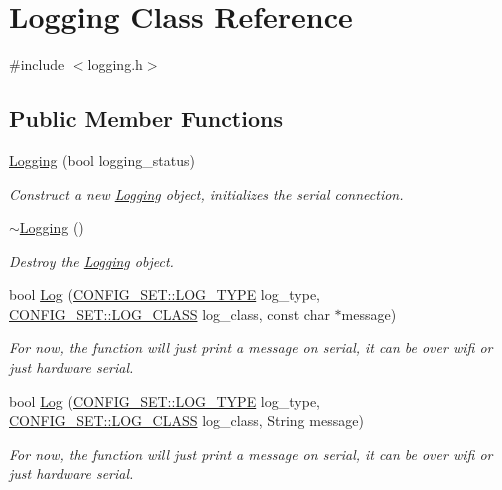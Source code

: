 \hypertarget{classLogging}{}\section{Logging Class Reference}
\label{classLogging}


{\ttfamily \#include $<$logging.\+h$>$}

\subsection*{Public Member Functions}
\begin{DoxyCompactItemize}
\item 
\hyperlink{classLogging_a3180cbe3cd3f25a926092066a157b884}{Logging} (bool logging\+\_\+status)
\begin{DoxyCompactList}\small\item\em Construct a new \hyperlink{classLogging}{Logging} object, initializes the serial connection. \end{DoxyCompactList}\item 
\hyperlink{classLogging_af6a0971121f5b0d9d6ebfb4e69b20a4d}{$\sim$\+Logging} ()
\begin{DoxyCompactList}\small\item\em Destroy the \hyperlink{classLogging}{Logging} object. \end{DoxyCompactList}\item 
bool \hyperlink{classLogging_abefeba86ea7c9ec93b7de22fc03a558e}{Log} (\hyperlink{namespaceCONFIG__SET_aaf9764960ee214f0eaabd2461e30e932}{C\+O\+N\+F\+I\+G\+\_\+\+S\+E\+T\+::\+L\+O\+G\+\_\+\+T\+Y\+PE} log\+\_\+type, \hyperlink{namespaceCONFIG__SET_a3c4daebec2ea4e9f6affb5b3abbeb863}{C\+O\+N\+F\+I\+G\+\_\+\+S\+E\+T\+::\+L\+O\+G\+\_\+\+C\+L\+A\+SS} log\+\_\+class, const char $\ast$message)
\begin{DoxyCompactList}\small\item\em For now, the function will just print a message on serial, it can be over wifi or just hardware serial. \end{DoxyCompactList}\item 
bool \hyperlink{classLogging_a7ad9e952d45e4b456006755beb62e9d3}{Log} (\hyperlink{namespaceCONFIG__SET_aaf9764960ee214f0eaabd2461e30e932}{C\+O\+N\+F\+I\+G\+\_\+\+S\+E\+T\+::\+L\+O\+G\+\_\+\+T\+Y\+PE} log\+\_\+type, \hyperlink{namespaceCONFIG__SET_a3c4daebec2ea4e9f6affb5b3abbeb863}{C\+O\+N\+F\+I\+G\+\_\+\+S\+E\+T\+::\+L\+O\+G\+\_\+\+C\+L\+A\+SS} log\+\_\+class, String message)
\begin{DoxyCompactList}\small\item\em For now, the function will just print a message on serial, it can be over wifi or just hardware serial. \end{DoxyCompactList}\item 

\end{DoxyCompactItemize}
